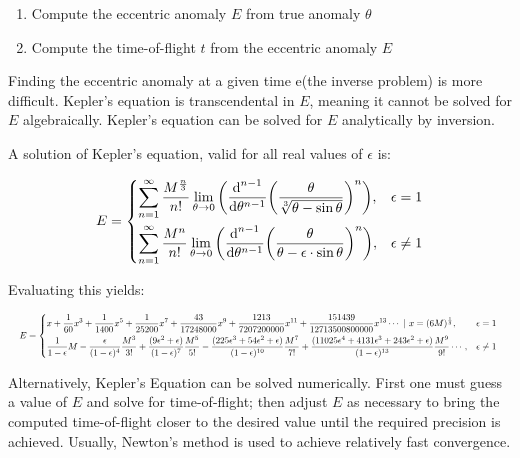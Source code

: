 \documentclass[12pt]{article}
\begin{document}
\begin{enumerate}
  \item Compute the eccentric anomaly \(E\) from true anomaly \(\theta\)
  \item Compute the time-of-flight \(t\) from the eccentric anomaly \(E\)
\end{enumerate}

Finding the eccentric anomaly at a given time e(the inverse problem) is more
difficult. Kepler's equation is transcendental in \(E\), meaning it cannot be
solved for \(E\) algebraically. Kepler's equation can be solved for \(E\)
analytically by inversion.

A solution of Kepler's equation, valid for all real values of \(\epsilon\) is:

\begin{align*}
  E=\begin{dcases}
  \sum\limits_{n=1}^{\infty} {\frac{M^{\frac{n}{3}}}{n!}} \lim\limits_{\theta
  \to 0} {\left(\frac{\text{d}^{n-1}}{\text{d}\theta^{n-1}}
{\left(\frac{\theta}{\sqrt[3]{\theta-\sin\theta}}\right)}^{n}\right)} , &
\epsilon = 1 \\
  \sum\limits_{n=1}^{\infty} {\frac{M^{n}}{n!}} \lim\limits_{\theta \to 0}
  {\left(\frac{\text{d}^{n-1}}{\text{d}\theta^{n-1}}
  {\left(\frac{\theta}{\theta-\epsilon \cdot \sin \theta}\right)}^{n}\right)} ,
  & \epsilon \ne 1
  \end{dcases}
\end{align*}

Evaluating this yields:

\begin{displaymath}
  \hspace*{-0.0 \textwidth} \resizebox{ 1.0 \textwidth}{!}{$E=\begin{dcases} x
    + \frac{1}{60} x^3 + \frac{1}{1400} x^5 + \frac{1}{25200} x^7 +
  \frac{43}{17248000}x^9 + \frac{1213}{7207200000} x^{11} +
\frac{151439}{12713500800000} x^{13} \cdots \ | \ x=(6M)^\frac{1}{3} , &
\epsilon = 1 \\
\frac{1}{1-\epsilon}M-\frac{\epsilon}{(1-\epsilon)^4}\frac{M^3}{3!} +
\frac{(9\epsilon^2+\epsilon)}{(1-\epsilon)^7}\frac{M^5}{5!} -
\frac{(225\epsilon^3+54\epsilon^2+\epsilon)}{(1-\epsilon)^{10}}\frac{M^7}{7!} +
\frac{(11025\epsilon^4 +
4131\epsilon^3+243\epsilon^2+\epsilon)}{(1-\epsilon)^{13}}\frac{M^9}{9!} \cdots
, & \epsilon \ne 1 \end{dcases} $
    }
\end{displaymath}

Alternatively, Kepler's Equation can be solved numerically. First one must
guess a value of \(E\) and solve for time-of-flight; then adjust \(E\) as
necessary to bring the computed time-of-flight closer to the desired value
until the required precision is achieved. Usually, Newton's method is used to
achieve relatively fast convergence.
\end{document}
